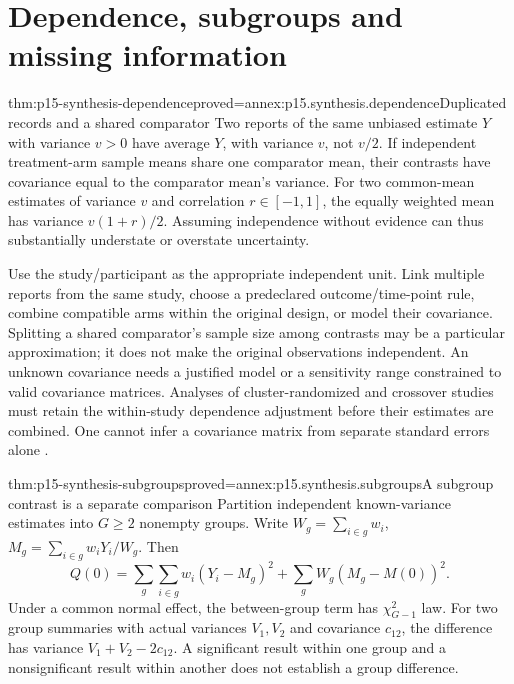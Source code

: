 \section{Dependence, subgroups and missing information}
\label{sec:p15-synthesis-dependence}

\begin{hbtheorem}{thm:p15-synthesis-dependence}{proved=annex:p15.synthesis.dependence}{Duplicated records and a shared comparator}
Two reports of the same unbiased estimate \(Y\) with variance \(v>0\)
have average \(Y\), with variance \(v\), not \(v/2\). If independent
treatment-arm sample means share one comparator mean, their contrasts have
covariance equal to the comparator mean's variance. For two common-mean
estimates of variance \(v\) and correlation \(r\in[-1,1]\), the
equally weighted mean has variance \(v(1+r)/2\). Assuming independence
without evidence can thus substantially understate or overstate uncertainty.
\end{hbtheorem}

Use the study/participant as the appropriate independent unit. Link multiple
reports from the same study, choose a predeclared outcome/time-point rule,
combine compatible arms within the original design, or model their covariance.
Splitting a shared comparator's sample size among contrasts may be a particular
approximation; it does not make the original observations independent.
An unknown covariance needs a justified model or a sensitivity range constrained
to valid covariance matrices. Analyses of cluster-randomized and crossover
studies must retain the within-study dependence adjustment before their estimates
are combined. One cannot infer a covariance matrix from separate standard errors
alone \cite[secs.~10.3.3, 10.12.1]{DeeksEtAl2024Cochrane10}.

\begin{hbtheorem}{thm:p15-synthesis-subgroups}{proved=annex:p15.synthesis.subgroups}{A subgroup contrast is a separate comparison}
Partition independent known-variance estimates into \(G\geq2\) nonempty
groups. Write \(W_g=\sum_{i\in g}w_i\),
\(M_g=\sum_{i\in g}w_iY_i/W_g\). Then
\[
 Q(0)=\sum_g\sum_{i\in g}w_i(Y_i-M_g)^2
                    +\sum_gW_g(M_g-M(0))^2.
\]
Under a common normal effect, the between-group term has
\(\chi^2_{G-1}\) law. For two group summaries with actual variances
\(V_1,V_2\) and covariance \(c_{12}\), the difference has variance
\(V_1+V_2-2c_{12}\). A significant result within one group and a
nonsignificant result within another does not establish a group difference.
\end{hbtheorem}

